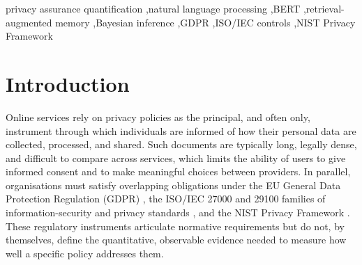 \documentclass[final,3p,times,twocolumn]{elsarticle}
\begin{document}
\begin{frontmatter}
\begin{abstract}
            
		\end{abstract}

		\begin{keyword}
			privacy assurance quantification \sep natural language processing \sep BERT
			\sep retrieval-augmented memory \sep Bayesian inference \sep GDPR \sep ISO/IEC
			controls \sep NIST Privacy Framework
		\end{keyword}
	\end{frontmatter}



    
    \section{Introduction}
	\label{sec:intro}
    Online services rely on privacy policies as the principal, and often only, instrument through which individuals are informed of how their personal data are collected, processed, and shared. Such documents are typically long, legally dense, and difficult to compare across services, which limits the ability of users to give informed consent and to make meaningful choices	between providers. In parallel, organisations must satisfy overlapping obligations under the EU General Data Protection Regulation (GDPR) \citep{gdpr2016}, the ISO/IEC 27000 and 29100 families of information-security and privacy standards \citep{iso27001_2022,iso27002_2022,iso29100_2011}, and the NIST Privacy Framework \citep{nist_pf_2020}. These regulatory instruments articulate normative requirements but do not, by themselves, define the	quantitative, observable evidence needed to measure how well a specific policy addresses them.
    
\end{document}
